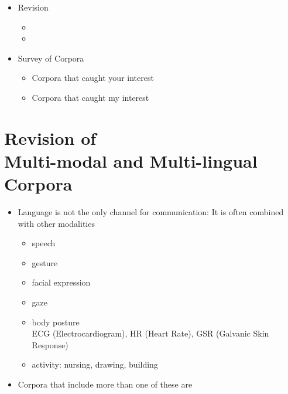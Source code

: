 \documentclass[a4paper,landscape,headrule,footrule,xetex]{foils}
\begin{document}

\maketitle
{}\makexeCJKactive


\begin{itemize} 
\item Revision 
  \begin{itemize}
  \item {}
  \item {}
  \end{itemize}
\item Survey of Corpora
  \begin{itemize}
  \item Corpora that caught your interest
  \item Corpora that caught my interest
  \end{itemize}
\end{itemize}



\section{Revision of \\
Multi-modal  and Multi-lingual Corpora}



\begin{itemize}
\item Language is not the only channel for communication: It is often
  combined with other modalities
  \begin{itemize}
  \item speech
  \item gesture
  \item facial expression
  \item gaze
  \item body posture
\\ ECG (Electrocardiogram), HR (Heart Rate), GSR (Galvanic Skin Response)
  \item activity: nursing, drawing, building
  \end{itemize}
\item Corpora that include more than one of these are 
\end{itemize}
\end{document}
